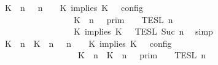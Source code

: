 \begin{isabellebody}
\ {\isacartoucheopen}{\isasymlbrakk}\ {\isacharparenleft}{\isacharparenleft}K\ {\isasymnot}{\isasymUp}\ n{\isacharparenright}\ {\isacharhash}\ {\isasymGamma}{\isacharparenright}{\isacharcomma}\ n\ {\isasymturnstile}\ {\isasymPsi}\ {\isasymtriangleright}\ {\isacharparenleft}{\isacharparenleft}K\ implies\ K\ {\isacharhash}\ {\isasymPhi}{\isacharparenright}\ {\isasymrbrakk}\isactrlsub c\isactrlsub o\isactrlsub n\isactrlsub f\isactrlsub i\isactrlsub g\isanewline
\ \ \ \ \ \ \ \ \ \ \ \ \ \ \ \ {\isacharequal}\ {\isasymlbrakk}{\isasymlbrakk}\ {\isacharparenleft}K\ {\isasymnot}{\isasymUp}\ n{\isacharparenright}\ {\isacharhash}\ {\isasymGamma}\ {\isasymrbrakk}{\isasymrbrakk}\isactrlsub p\isactrlsub r\isactrlsub i\isactrlsub m\ {\isasyminter}\ {\isasymlbrakk}{\isasymlbrakk}\ {\isasymPsi}\ {\isasymrbrakk}{\isasymrbrakk}\isactrlsub T\isactrlsub E\isactrlsub S\isactrlsub L\isactrlbsup {\isasymge}\ n\isactrlesup \isanewline
\ \ \ \ \ \ \ \ \ \ \ \ \ \ \ \ {\isasyminter}\ {\isasymlbrakk}{\isasymlbrakk}\ {\isacharparenleft}K\ implies\ K\ {\isacharhash}\ {\isasymPhi}\ {\isasymrbrakk}{\isasymrbrakk}\isactrlsub T\isactrlsub E\isactrlsub S\isactrlsub L\isactrlbsup {\isasymge}\ Suc\ n\isactrlesup {\isacartoucheclose}\ \isamarkupfalse%
\ simp\isanewline
\ \ \isamarkupfalse%
\ \isamarkupfalse%
\ {\isacartoucheopen}{\isasymlbrakk}\ {\isacharparenleft}{\isacharparenleft}K\ {\isasymUp}\ n{\isacharparenright}\ {\isacharhash}\ {\isacharparenleft}K\ {\isasymUp}\ n{\isacharparenright}\ {\isacharhash}\ {\isasymGamma}{\isacharparenright}{\isacharcomma}\ n\ {\isasymturnstile}\ {\isasymPsi}\ {\isasymtriangleright}\ {\isacharparenleft}{\isacharparenleft}K\ implies\ K\ {\isacharhash}\ {\isasymPhi}{\isacharparenright}\ {\isasymrbrakk}\isactrlsub c\isactrlsub o\isactrlsub n\isactrlsub f\isactrlsub i\isactrlsub g\isanewline
\ \ \ \ \ \ \ \ \ \ \ \ \ \ \ \ {\isacharequal}\ \ {\isasymlbrakk}{\isasymlbrakk}\ {\isacharparenleft}{\isacharparenleft}K\ {\isasymUp}\ n{\isacharparenright}\ {\isacharhash}\ {\isacharparenleft}K\ {\isasymUp}\ n{\isacharparenright}\ {\isacharhash}\ {\isasymGamma}{\isacharparenright}\ {\isasymrbrakk}{\isasymrbrakk}\isactrlsub p\isactrlsub r\isactrlsub i\isactrlsub m\ {\isasyminter}\ {\isasymlbrakk}{\isasymlbrakk}\ {\isasymPsi}\ {\isasymrbrakk}{\isasymrbrakk}\isactrlsub T\isactrlsub E\isactrlsub S\isactrlsub L\isactrlbsup {\isasymge}\ n\isactrlesup \isanewline

\end{isabellebody}
